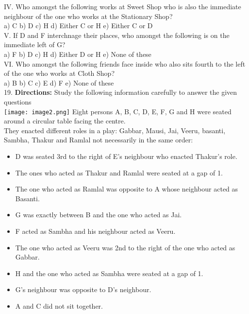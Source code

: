 \documentclass[
]{article}
\begin{document}
IV. Who amongst the following works at Sweet Shop who is also the immediate neighbour
of the one who works at the Stationary Shop?\\
a) C \hspace{2mm}b) D \hspace{2mm}c) H
\hspace{2mm}d) Either C or H \hspace{2mm}e) Either C or D\\

V. If D and F interchnage their places, who amongst the following is on the immediate left
of G?\\
a) F \hspace{2mm}b) D \hspace{2mm}c) H
\hspace{2mm}d) Either D or H \hspace{2mm}e) None of these\\

VI. Who amongst the following friends face inside who also sits fourth to the left of the one
who works at Cloth Shop?\\
a) B \hspace{2mm}b) C \hspace{2mm}c) E \hspace{2mm}d) F \hspace{2mm}e) None of these\\

19. \textbf{Directions:} Study the following information carefully to answer the given questions\\
\texttt{[image: image2.png]}
Eight persons A, B, C, D, E, F, G and H were seated around a circular table facing the centre.\\
They enacted different roles in a play: Gabbar, Mausi, Jai, Veeru, basanti, Sambha, Thakur
and Ramlal not necessarily in the same order:\\
\begin{itemize}

\item D was seated 3rd to the right of E’s neighbour who enacted Thakur’s role.
\item The ones who acted as Thakur and Ramlal were seated at a gap of 1.
\item The one who acted as Ramlal was opposite to A whose neighbour acted as Basanti.
\item G was exactly between B and the one who acted as Jai.
\item F acted as Sambha and his neighbour acted as Veeru.
\item The one who acted as Veeru was 2nd to the right of the one who acted as Gabbar.
\item H and the one who acted as Sambha were seated at a gap of 1.
\item G’s neighbour was opposite to D’s neighbour.
\item A and C did not sit together.\\
\end{itemize}
\end{document}
